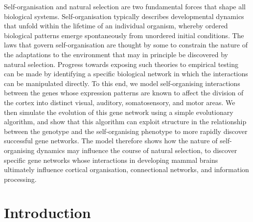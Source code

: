 \documentclass[10pt,letterpaper]{article}
\begin{document}
Self-organisation and natural selection are two fundamental forces that shape all biological systems. Self-organisation typically describes developmental dynamics that unfold within the lifetime of an individual organism, whereby ordered biological patterns emerge spontaneously from unordered initial conditions. The laws that govern self-organisation are thought by some to constrain the nature of the adaptations to the environment that may in principle be discovered by natural selection. Progress towards exposing such theories to empirical testing can be made by identifying a specific biological network in which the interactions can be manipulated directly. To this end, we model self-organising interactions between the genes whose expression patterns are known to affect the division of the cortex into distinct visual, auditory, somatosensory, and motor areas. We then simulate the evolution of this gene network using a simple evolutionary algorithm, and show that this algorithm can exploit structure in the relationship between the genotype and the self-organising phenotype to more rapidly discover successful gene networks. The model therefore shows how the nature of self-organising dynamics may influence the course of natural selection, to discover specific gene networks whose interactions in developing mammal brains ultimately influence cortical organisation, connectional networks, and information processing.


\linenumbers

\section*{Introduction}
\end{document}
